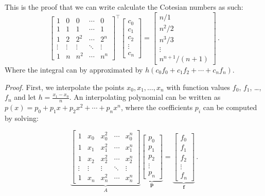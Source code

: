 \documentclass{book}
\begin{document}
This is the proof that we can write calculate the Cotesian numbers as such:
\begin{equation}
    \begin{bmatrix}
        1&0&0&\cdots&0 \\
        1&1&1&\cdots&1 \\
        1&2&2^2&\cdots&2^n \\
        \vdots&\vdots & \vdots & \ddots & \vdots\\
        1&n&n^2&\cdots&n^n
    \end{bmatrix}^\top
    \begin{bmatrix}
        c_0\\
        c_1\\
        c_2\\
        \vdots \\
        c_n
    \end{bmatrix}
    =
    \begin{bmatrix}
        n/1 \\
        n^2/2 \\
        n^3/3 \\
        \vdots \\
        n^{n+1}/(n+1)
    \end{bmatrix} \,.\nonumber
\end{equation}
Where the integral can by approximated by $h(c_0f_0+c_1f_2+\cdots+c_nf_n)$.
\vspace{1em}

\textit{Proof.}
First, we interpolate the points $x_0, x_1, \dots, x_n$ with function values $f_0$, $f_1$, \dots, $f_n$ and let $h=\frac{x_1-x_0}{n}$.
An interpolating polynomial can be written as $p(x)=p_0 + p_1 x + p_2 x^2 + \cdots + p_n x^n$, where the coefficients $p_i$ can be computed by solving:

\begin{equation}
    \underbrace{\begin{bmatrix}
        1&x_0&x_0^2&\cdots&x_0^n \\
        1&x_1&x_1^2&\cdots&x_1^n \\
        1&x_2&x_2^2&\cdots&x_2^n \\
        \vdots&\vdots & \vdots & \ddots & \vdots\\
        1&x_n&x_n^2&\cdots&x_n^n
    \end{bmatrix}}_{A}
    \underbrace{\begin{bmatrix}
        p_0\\
        p_1\\
        p_2\\
        \vdots \\
        p_n
    \end{bmatrix}}_{\mathbf p}
    =
    \underbrace{\begin{bmatrix}
        f_0 \\
        f_1 \\
        f_2 \\
        \vdots \\
        f_n
    \end{bmatrix}}_{\mathbf f} \,.\nonumber
\end{equation}
\end{document}
